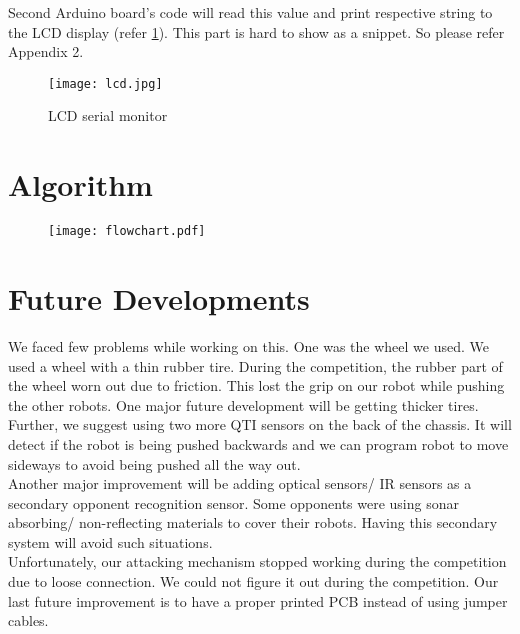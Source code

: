 \documentclass[11pt, letterpaper, oneside]{article}
\begin{document}
Second Arduino board's code will read this value and print respective string to the LCD display (refer \cref{fig:lcd}). This part is hard to show as a snippet. So please refer Appendix 2.


\begin{figure}[bth]
	\begin{center}
		\texttt{[image: lcd.jpg]}
		\caption{LCD serial monitor}
		\label{fig:lcd}
	\end{center}
\end{figure}


\newpage
\section{Algorithm}
\begin{figure}[h!]
	\begin{center}
		\texttt{[image: flowchart.pdf]}
		\label{fig:flowchart}
	\end{center}
\end{figure}

\newpage
\section{Future Developments}

We faced few problems while working on this. One was the wheel we used. We used a wheel with a thin rubber tire. During the competition, the rubber part of the wheel worn out due to friction. This lost the grip on our robot while pushing the other robots. One major future development will be getting thicker tires.\\

Further, we suggest using two more QTI sensors on the back of the chassis. It will detect if the robot is being pushed backwards and we can program robot to move sideways to avoid being pushed all the way out.\\

Another major improvement will be adding optical sensors/ IR sensors as a secondary opponent recognition sensor. Some opponents were using sonar absorbing/ non-reflecting materials to cover their robots. Having this secondary system will avoid such situations.\\

Unfortunately, our attacking mechanism stopped working during the competition due to loose connection. We could not figure it out during the competition. Our last future improvement is to have a proper printed PCB instead of using jumper cables.
\end{document}
